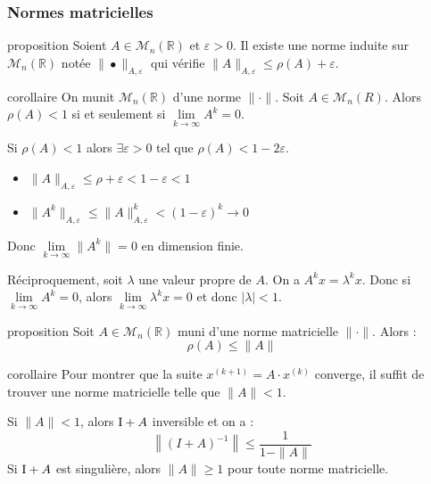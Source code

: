 \documentclass{beamer}
\begin{document}
\begin{frame}
\frametitle{Normes matricielles}
\begin{block}{proposition}
Soient $A \in \mathscr{M}_n ( \mathbb{R})$ et $ \varepsilon>0$. Il existe une norme induite sur $\mathscr{M}_n(\mathbb{R})$ notée $\| \bullet \|_{A, \varepsilon}$ qui vérifie $\| A \|_{A, \varepsilon}  \leqslant \rho(A) + \varepsilon$.
\end{block}
\begin{block}{corollaire}
On munit $\mathscr{M}_n (\mathbb{R})$ d'une norme $\| \cdot \|$. Soit $A \in \mathscr{M}_n (R)$. Alors $\rho(A)<1$ si et seulement si $\lim\limits_{k \to \infty} A^k=0$. 
\end{block}

Si $\rho(A) < 1$ alors  $ \exists \varepsilon>0$ tel que $\rho(A) < 1 - 2 \varepsilon$. 
\begin{itemize}
\item $ \| A \|_{A, \varepsilon} \leqslant \rho + \varepsilon < 1 - \varepsilon <1 $
\item $ \| A^k \|_{A, \varepsilon} \leqslant \| A \|_{A, \varepsilon}^k < (1 - \varepsilon)^k \to 0$
\end{itemize}
Donc $ \lim\limits_{k \to \infty } \| A^k \| = 0$ en dimension finie.

Réciproquement, soit $\lambda$ une valeur propre de $A$. On a $A^kx= \lambda^k x$. Donc si $\lim\limits_{k \to \infty} A^k=0$,  alors $\lim\limits_{k \to \infty }\lambda^k x =0$ et donc $| \lambda | <1$.

\end{frame}
\begin{frame}
\begin{block}{proposition}
Soit $A \in \mathscr{M}_n ( \mathbb{R})$ muni d'une norme matricielle $\| \cdot \|$. Alors :
\[
\rho(A) \leqslant \| A \|
\]
\end{block}

\begin{block}{corollaire}
Pour montrer que la suite $x^{(k+1)} = A \cdot x^{(k)}$  converge, il suffit de trouver une norme matricielle telle que $\| A \| <1$.
\end{block}

\begin{theorem}
Si $\| A \| <1$, alors ${\rm I} + A $ inversible et on a :
\[
\left\| (I+A)^{-1} \right\| \leqslant \frac{1}{1-\|A\|}
\]
Si ${\rm I} + A $ est singulière, alors $\| A \| \geqslant 1$ pour toute norme matricielle.
\end{theorem}


\end{frame}
\end{document}
